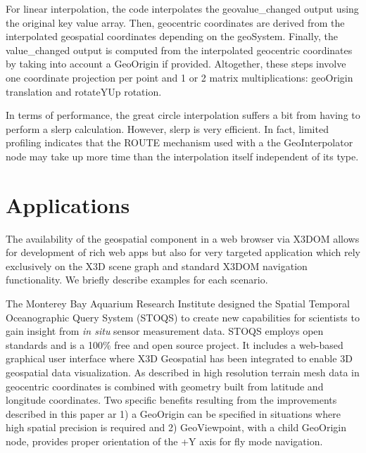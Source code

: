 \documentclass{acmsiggraph}                     %
\begin{document}
For linear interpolation, the code interpolates the geovalue\_changed output using the original key value array. Then, geocentric coordinates are derived from the interpolated geospatial coordinates depending on the geoSystem. Finally, the  value\_changed output is computed from the interpolated geocentric coordinates by taking into account a GeoOrigin if provided. Altogether, these steps involve one coordinate projection per point and 1 or 2 matrix multiplications: geoOrigin translation and rotateYUp rotation.

In terms of performance, the great circle interpolation suffers a bit from having to perform a slerp calculation. However, slerp is very efficient. In fact, limited profiling indicates that the ROUTE mechanism used with a the GeoInterpolator node may take up more time than the interpolation itself independent of its type.



\section{Applications}

The availability of the geospatial component in a web browser via X3DOM allows for development of rich  web apps but also for very targeted application which rely exclusively on the X3D scene graph and standard X3DOM navigation functionality. We briefly describe examples for each scenario.

The Monterey Bay Aquarium Research Institute designed the Spatial Temporal Oceanographic Query System (STOQS) \cite{stoqsyoutube} to 
create new capabilities for scientists to gain insight from \textit{in situ} sensor measurement data. STOQS employs open standards 
and is a 100\% free and open source project. It includes a web-based graphical user interface where X3D Geospatial has been integrated 
to enable 3D geospatial data visualization. As described in \cite{mccann14} high resolution terrain mesh data in geocentric 
coordinates is combined with geometry built from latitude and longitude coordinates. Two specific benefits resulting from
the improvements described in this paper ar 1) a GeoOrigin can be specified in situations where high spatial precision is required and 
2) GeoViewpoint, with a child GeoOrigin node, provides proper orientation of the +Y axis for fly mode navigation.
\end{document}

